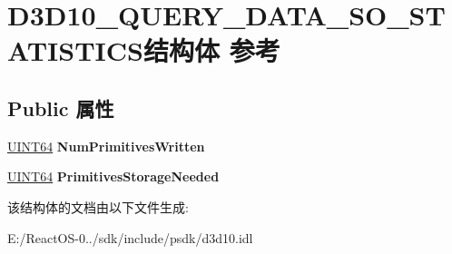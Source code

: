 \hypertarget{struct_d3_d10___q_u_e_r_y___d_a_t_a___s_o___s_t_a_t_i_s_t_i_c_s}{}\section{D3\+D10\+\_\+\+Q\+U\+E\+R\+Y\+\_\+\+D\+A\+T\+A\+\_\+\+S\+O\+\_\+\+S\+T\+A\+T\+I\+S\+T\+I\+C\+S结构体 参考}
\label{struct_d3_d10___q_u_e_r_y___d_a_t_a___s_o___s_t_a_t_i_s_t_i_c_s}
\subsection*{Public 属性}
\begin{DoxyCompactItemize}
\item 
\mbox{\label{struct_d3_d10___q_u_e_r_y___d_a_t_a___s_o___s_t_a_t_i_s_t_i_c_s_aa6d3caf00efd2acb1a11704a24c356e4}} 
\hyperlink{_processor_bind_8h_a57be03562867144161c1bfee95ca8f7c}{U\+I\+N\+T64} {\bfseries Num\+Primitives\+Written}
\item 
\mbox{\label{struct_d3_d10___q_u_e_r_y___d_a_t_a___s_o___s_t_a_t_i_s_t_i_c_s_a7d0a774ee2d29690bc2b4d5c04b86dbc}} 
\hyperlink{_processor_bind_8h_a57be03562867144161c1bfee95ca8f7c}{U\+I\+N\+T64} {\bfseries Primitives\+Storage\+Needed}
\end{DoxyCompactItemize}


该结构体的文档由以下文件生成\+:\begin{DoxyCompactItemize}
\item 
E\+:/\+React\+O\+S-\/0../sdk/include/psdk/d3d10.\+idl\end{DoxyCompactItemize}
